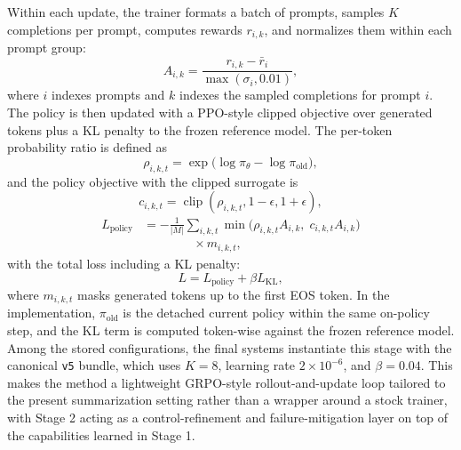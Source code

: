 \documentclass[11pt]{article}
\begin{document}
Within each update, the trainer formats a batch of prompts, samples $K$
completions per prompt, computes rewards $r_{i,k}$, and normalizes them
within each prompt group:
\begin{equation}
A_{i,k} = \frac{r_{i,k} - \bar{r}_{i}}{\max(\sigma_i, 0.01)},
\end{equation}
where $i$ indexes prompts and $k$ indexes the sampled completions for prompt $i$.
The policy is then updated with a PPO-style clipped objective over generated
tokens plus a KL penalty to the frozen reference model. The per-token
probability ratio is defined as
\begin{equation}
\rho_{i,k,t} = \exp\bigl(\log \pi_{\theta} - \log \pi_{\text{old}}\bigr),
\end{equation}
and the policy objective with the clipped surrogate is
\begin{equation}
c_{i,k,t} = \operatorname{clip}(\rho_{i,k,t}, 1-\epsilon, 1+\epsilon),
\end{equation}
\begin{equation}
\begin{aligned}
L_{\text{policy}}
&= -\frac{1}{|M|} \sum_{i,k,t}
   \min\bigl(\rho_{i,k,t} A_{i,k},\; c_{i,k,t} A_{i,k}\bigr)\\[-1mm]
&\qquad\qquad {}\times m_{i,k,t},
\end{aligned}
\end{equation}
with the total loss including a KL penalty:
\begin{equation}
L = L_{\text{policy}} + \beta L_{\text{KL}},
\end{equation}
where $m_{i,k,t}$ masks generated tokens up to the first EOS token.
In the implementation, $\pi_{\text{old}}$ is the detached current policy
within the same on-policy step, and the KL term is computed token-wise
against the frozen reference model. Among the stored configurations, the final
systems instantiate this stage with the canonical \texttt{v5} bundle, which
uses $K=8$, learning rate $2\times10^{-6}$, and $\beta=0.04$. This makes the
method a lightweight GRPO-style rollout-and-update loop tailored to the
present summarization setting rather than a wrapper around a stock trainer,
with Stage 2 acting as a control-refinement and failure-mitigation layer on
top of the capabilities learned in Stage 1.
\end{document}
